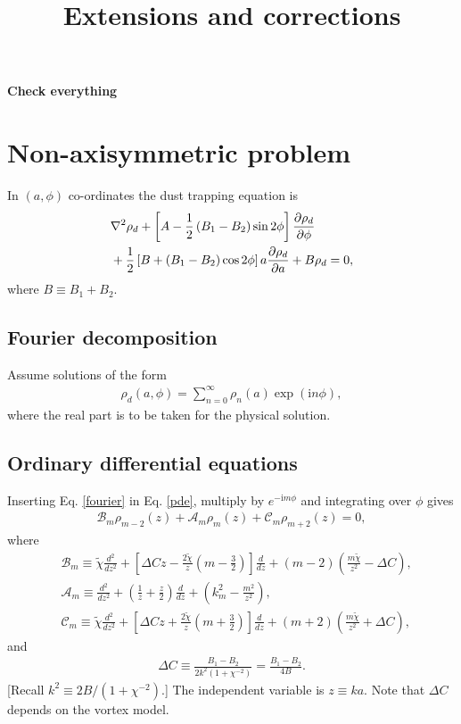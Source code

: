 \documentclass[12pt]{article} %
\title{Extensions and corrections}
\begin{document}
\maketitle
{\bf Check everything}
\section{Non-axisymmetric problem}
In $(a,\phi)$ co-ordinates the dust trapping equation is
\begin{align}\label{pde}
&\nabla^2\rho_d + \left[A - \frac{1}{2}\left(B_1-B_2\right)\sin{2\phi}\right]\frac{\partial\rho_d}{\partial\phi}\notag\\
&+\frac{1}{2}\left[B+\left(B_1-B_2\right)\cos{2\phi}\right]a\frac{\partial\rho_d}{\partial a} + B\rho_d = 0,
\end{align}
where $B\equiv B_1 + B_2$. 
\subsection{Fourier decomposition}
Assume solutions of the form
\begin{align}\label{fourier}
\rho_d(a,\phi) = \sum_{n=0}^\infty\rho_n(a)\exp{(\mathrm{i}n\phi)},	
\end{align}
where the real part is to be taken for the physical solution. 	

\subsection{Ordinary differential equations}
Inserting Eq. \ref{fourier} in Eq. \ref{pde}, multiply by $e^{-\mathrm{i}m\phi}$ and integrating over $\phi$ gives 
\begin{align}\label{ode}
\mathcal{B}_m\rho_{m-2} (z)+ \mathcal{A}_m\rho_m(z) + \mathcal{C}_m\rho_{m+2}(z) = 0,
\end{align}
where
\begin{align}
&\mathcal{B}_m \equiv \tilde{\chi}\frac{d^2}{dz^2} + \left[\Delta C z - \frac{2\tilde{\chi}}{z}\left(m-\frac{3}{2}\right)\right]
\frac{d}{dz} + \left(m-2\right)\left(\frac{m\tilde{\chi}}{z^2} -\Delta C\right),\\
&\mathcal{A}_m\equiv\frac{d^2}{dz^2} + \left(\frac{1}{z}+\frac{z}{2}\right)\frac{d}{dz} + \left(k_m^2-\frac{m^2}{z^2}\right),\\
&\mathcal{C}_m \equiv \tilde{\chi}\frac{d^2}{dz^2} + \left[\Delta C z + \frac{2\tilde{\chi}}{z}\left(m+\frac{3}{2}\right)\right]
\frac{d}{dz} + \left(m+2\right)\left(\frac{m\tilde{\chi}}{z^2} +\Delta C\right),
\end{align}
and
\begin{align}
\Delta C \equiv \frac{B_1-B_2}{2k^2(1+\chi^{-2})} = \frac{B_1 - B_2}{4B}.
\end{align}
[Recall $k^2\equiv 2B/\left(1+\chi^{-2}\right)$.] The independent variable is $z\equiv ka$. Note that $\Delta C$ depends on the vortex model. 
\end{document}
